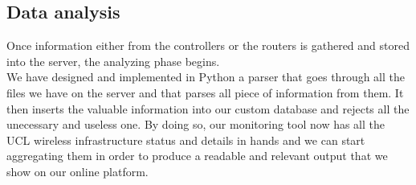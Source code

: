 \subsection{Data analysis}
Once information either from the controllers or the routers is gathered and stored into the server, the analyzing phase begins.\\
We have designed and implemented in Python a parser that goes through all the files we have on the server and that parses all piece of information from them. It then inserts the valuable information into our custom database and rejects all the unecessary and useless one. By doing so, our monitoring tool now has all the UCL wireless infrastructure status and details in hands and we can start aggregating them in order to produce a readable and relevant output that we show on our online platform.\\


